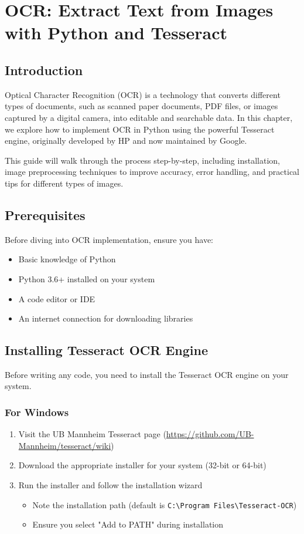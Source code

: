 \documentclass{book}
\begin{document}
	
	
	
	
	
	\chapter{OCR: Extract Text from Images with Python and Tesseract}
	
	\section{Introduction}
	Optical Character Recognition (OCR) is a technology that converts different types of documents, such as scanned paper documents, PDF files, or images captured by a digital camera, into editable and searchable data. In this chapter, we explore how to implement OCR in Python using the powerful Tesseract engine, originally developed by HP and now maintained by Google.
	
	This guide will walk through the process step-by-step, including installation, image preprocessing techniques to improve accuracy, error handling, and practical tips for different types of images.
	
	\section{Prerequisites}
	Before diving into OCR implementation, ensure you have:
	\begin{itemize}
		\item Basic knowledge of Python
		\item Python 3.6+ installed on your system
		\item A code editor or IDE
		\item An internet connection for downloading libraries
	\end{itemize}
	
	\section{Installing Tesseract OCR Engine}
	Before writing any code, you need to install the Tesseract OCR engine on your system.
	
	\subsection{For Windows}
	\begin{enumerate}
		\item Visit the UB Mannheim Tesseract page (\url{https://github.com/UB-Mannheim/tesseract/wiki})
		\item Download the appropriate installer for your system (32-bit or 64-bit)
		\item Run the installer and follow the installation wizard
		\begin{itemize}
			\item Note the installation path (default is \texttt{C:\textbackslash Program Files\textbackslash Tesseract-OCR})
			\item Ensure you select "Add to PATH" during installation
		\end{itemize}
	\end{enumerate}
	
\end{document}
